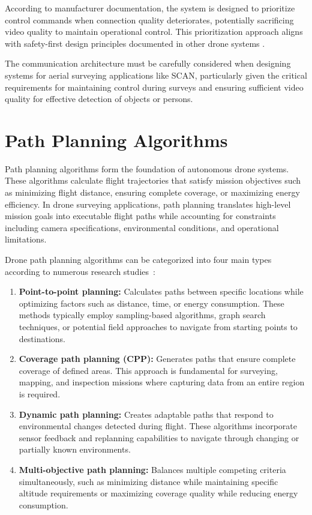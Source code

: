 According to manufacturer documentation, the system is designed to prioritize control commands when connection quality deteriorates, potentially sacrificing video quality to maintain operational control. This prioritization approach aligns with safety-first design principles documented in other drone systems \cite{Koubaa2019}.

The communication architecture must be carefully considered when designing systems for aerial surveying applications like SCAN, particularly given the critical requirements for maintaining control during surveys and ensuring sufficient video quality for effective detection of objects or persons.

\section{Path Planning Algorithms}

Path planning algorithms form the foundation of autonomous drone systems. These algorithms calculate flight trajectories that satisfy mission objectives such as minimizing flight distance, ensuring complete coverage, or maximizing energy efficiency. In drone surveying applications, path planning translates high-level mission goals into executable flight paths while accounting for constraints including camera specifications, environmental conditions, and operational limitations.

Drone path planning algorithms can be categorized into four main types according to numerous research studies~\cite{cabreira2019survey,MathworksUAV}:
\begin{enumerate}
    \item \textbf{Point-to-point planning:} Calculates paths between specific locations while optimizing factors such as distance, time, or energy consumption. These methods typically employ sampling-based algorithms, graph search techniques, or potential field approaches to navigate from starting points to destinations.
    \item \textbf{Coverage path planning (CPP):} Generates paths that ensure complete coverage of defined areas. This approach is fundamental for surveying, mapping, and inspection missions where capturing data from an entire region is required.
    \item \textbf{Dynamic path planning:} Creates adaptable paths that respond to environmental changes detected during flight. These algorithms incorporate sensor feedback and replanning capabilities to navigate through changing or partially known environments.
    \item \textbf{Multi-objective path planning:} Balances multiple competing criteria simultaneously, such as minimizing distance while maintaining specific altitude requirements or maximizing coverage quality while reducing energy consumption.
\end{enumerate}

